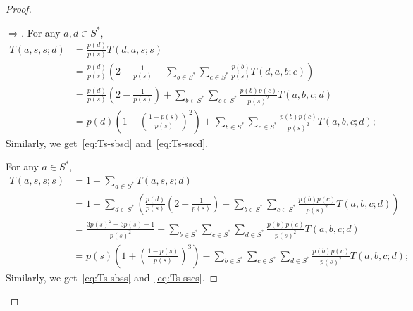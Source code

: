 \documentclass[10pt]{amsart}
\theoremstyle{definition}\newtheorem{defi}[theo]{Definition}\newtheorem{rema}[theo]{Remark}\newtheorem{exam}[theo]{Example}\newtheorem{exem}[theo]{Example}\newtheorem{nota}[theo]{Notation}
\newcounter{a}
\begin{document}
\begin{proof}
\begin{proof}[$\Rightarrow$]
For any $a,d \in S^*$,
\begin{align*}
T(a,s,s;d) & = \frac{p(d)}{p(s)} T(d,a,s;s) \\
& = \frac{p(d)}{p(s)} \left(2 - \frac{1}{p(s)} + \sum_{b \in S^*} \sum_{c \in S^*} \frac{p(b)}{p(s)}T(d,a,b;c)\right)\\
& = \frac{p(d)}{p(s)} \left(2 -\frac{1}{p(s)} \right) + \sum_{b \in S^*} \sum_{c \in S^*} \frac{p(b)p(c)}{p(s)^2}T(a,b,c;d)\\
& = p(d) \left(1 - \left(\frac{1-p(s)}{p(s)} \right)^2 \right) + \sum_{b \in S^*} \sum_{c \in S^*} \frac{p(b)p(c)}{p(s)^2}T(a,b,c;d);
\end{align*}
Similarly, we get~\eqref{eq:Ts-sbsd} and~\eqref{eq:Ts-sscd}.

For any $a \in S^*$,
\begin{align*}
T(a,s,s;s) & = 1 - \sum_{d \in S^*} T(a,s,s;d) \\
& = 1 - \sum_{d \in S^*} \left(\frac{p(d)}{p(s)} \left(2 - \frac{1}{p(s)}\right) + \sum_{b \in S^*} \sum_{c \in S^*} \frac{p(b)p(c)}{p(s)^2}T(a,b,c;d) \right)\\
& = \frac{3 p(s)^2 - 3p(s) + 1}{p(s)^2} - \sum_{b \in S^*} \sum_{c \in S^*} \sum_{d \in S^*} \frac{p(b)p(c)}{p(s)^2}T(a,b,c;d)\\
& = p(s) \left(1 + \left(\frac{1-p(s)}{p(s)} \right)^3 \right) - \sum_{b \in S^*} \sum_{c \in S^*} \sum_{d \in S^*} \frac{p(b)p(c)}{p(s)^2}T(a,b,c;d);
\end{align*}
Similarly, we get~\eqref{eq:Ts-sbss} and~\eqref{eq:Ts-sscs}.


\end{proof}
\end{proof}
\end{document}
